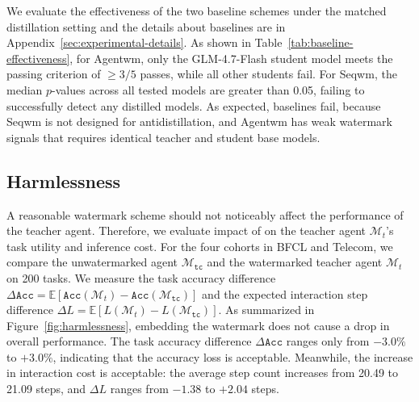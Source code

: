  We evaluate the effectiveness of the two baseline schemes under the matched distillation setting and the details about baselines are in Appendix~\ref{sec:experimental-details}. As shown in Table~\ref{tab:baseline-effectiveness}, for Agentwm, only the GLM-4.7-Flash student model meets the passing criterion of $\geq 3/5$ passes, while all other students fail. For Seqwm, the median $p$-values across all tested models are greater than 0.05, failing to successfully detect any distilled models. As expected, baselines fail, because Seqwm is not designed for antidistillation, and Agentwm has weak watermark signals that requires identical teacher and student base models.

\subsection{Harmlessness}
\label{sec:harmlessness}

 A reasonable watermark scheme should not noticeably affect the performance of the teacher agent. Therefore, we evaluate impact of \name{} on the teacher agent $\mathcal{M}_t$'s task utility and inference cost. For the four cohorts in BFCL and Telecom, we compare the unwatermarked agent $\mathcal{M}_\mathtt{tc}$ and the watermarked teacher agent $\mathcal{M}_t$ on 200 tasks. We measure the task accuracy difference $\Delta \mathtt{Acc} = \mathbb{E}[\mathtt{Acc}(\mathcal{M}_t) - \mathtt{Acc}(\mathcal{M}_\mathtt{tc})]$ and the expected interaction step difference $\Delta L = \mathbb{E}[L(\mathcal{M}_t) - L(\mathcal{M}_\mathtt{tc})]$. As summarized in Figure~\ref{fig:harmlessness}, embedding the watermark does not cause a drop in overall performance. The task accuracy difference $\Delta \mathtt{Acc}$ ranges only from $-3.0\%$ to $+3.0\%$, indicating that the accuracy loss is acceptable. Meanwhile, the increase in interaction cost is acceptable: the average step count increases from 20.49 to 21.09 steps, and $\Delta L$ ranges from $-1.38$ to $+2.04$ steps.

